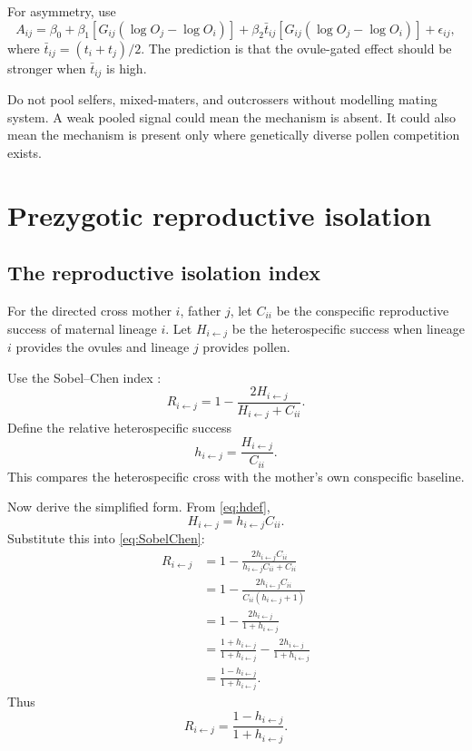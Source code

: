 \documentclass[12pt]{article}
\begin{document}
For asymmetry, use
\begin{equation}
A_{ij}=\beta_0+\beta_1\left[G_{ij}(\log O_j-\log O_i)\right]
+\beta_2\bar{t}_{ij}\left[G_{ij}(\log O_j-\log O_i)\right]
+\epsilon_{ij},
\label{eq:matingAsymmetry}
\end{equation}
where $\bar{t}_{ij}=(t_i+t_j)/2$. The prediction is that the ovule-gated effect should be stronger when $\bar{t}_{ij}$ is high.

\begin{cautionbox}
Do not pool selfers, mixed-maters, and outcrossers without modelling mating system. A weak pooled signal could mean the mechanism is absent. It could also mean the mechanism is present only where genetically diverse pollen competition exists.
\end{cautionbox}

\section{Prezygotic reproductive isolation}

\subsection{The reproductive isolation index}

For the directed cross mother $i$, father $j$, let $C_{ii}$ be the conspecific reproductive success of maternal lineage $i$. Let $H_{i\leftarrow j}$ be the heterospecific success when lineage $i$ provides the ovules and lineage $j$ provides pollen.

Use the Sobel--Chen index \citep{SobelChen2014}:
\begin{equation}
R_{i\leftarrow j}=1-\frac{2H_{i\leftarrow j}}{H_{i\leftarrow j}+C_{ii}}.
\label{eq:SobelChen}
\end{equation}
Define the relative heterospecific success
\begin{equation}
h_{i\leftarrow j}=\frac{H_{i\leftarrow j}}{C_{ii}}.
\label{eq:hdef}
\end{equation}
This compares the heterospecific cross with the mother's own conspecific baseline.

Now derive the simplified form. From \eqref{eq:hdef},
\begin{equation}
H_{i\leftarrow j}=h_{i\leftarrow j}C_{ii}.
\end{equation}
Substitute this into \eqref{eq:SobelChen}:
\begin{align}
R_{i\leftarrow j}
&=1-\frac{2h_{i\leftarrow j}C_{ii}}{h_{i\leftarrow j}C_{ii}+C_{ii}} \\
&=1-\frac{2h_{i\leftarrow j}C_{ii}}{C_{ii}(h_{i\leftarrow j}+1)} \\
&=1-\frac{2h_{i\leftarrow j}}{1+h_{i\leftarrow j}} \\
&=\frac{1+h_{i\leftarrow j}}{1+h_{i\leftarrow j}}-\frac{2h_{i\leftarrow j}}{1+h_{i\leftarrow j}} \\
&=\frac{1-h_{i\leftarrow j}}{1+h_{i\leftarrow j}}.
\end{align}
Thus
\begin{equation}
\boxed{R_{i\leftarrow j}=\frac{1-h_{i\leftarrow j}}{1+h_{i\leftarrow j}}}.
\label{eq:Rh}
\end{equation}
\end{document}
